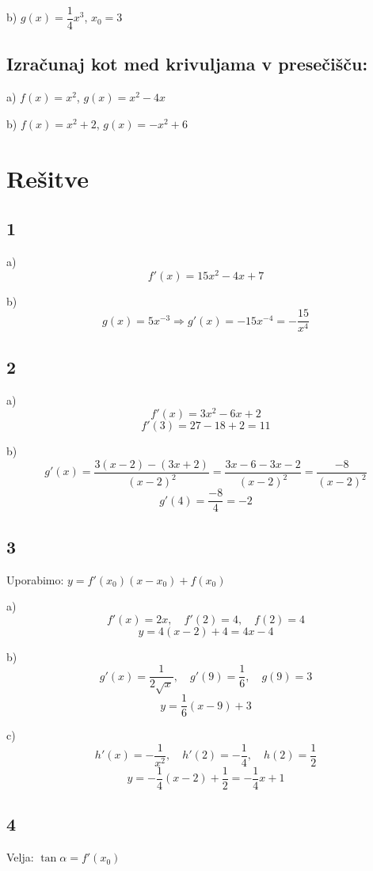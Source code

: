 \documentclass[a4paper,12pt]{article}
\begin{document}
b) $g(x)=\dfrac{1}{4}x^3$, \quad $x_0=3$


\vspace{1cm}


\addtocounter{tocke}{3+3}
\subsection{Izračunaj kot med krivuljama v presečišču:}

a) $f(x)=x^2$, \quad $g(x)=x^2-4x$

b) $f(x)=x^2+2$, \quad $g(x)=-x^2+6$

\vfill


\newpage

\section*{Rešitve}

\subsection*{1}
a)
\[
f'(x)=15x^2-4x+7
\]

b)
\[
g(x)=5x^{-3} \Rightarrow g'(x)=-15x^{-4}=-\frac{15}{x^4}
\]

\subsection*{2}
a)
\[
f'(x)=3x^2-6x+2
\]
\[
f'(3)=27-18+2=11
\]

b)
\[
g'(x)=\frac{3(x-2)-(3x+2)}{(x-2)^2}
=\frac{3x-6-3x-2}{(x-2)^2}
=\frac{-8}{(x-2)^2}
\]
\[
g'(4)=\frac{-8}{4}=-2
\]

\subsection*{3}
Uporabimo: $y=f'(x_0)(x-x_0)+f(x_0)$

a)
\[
f'(x)=2x,\quad f'(2)=4,\quad f(2)=4
\]
\[
y=4(x-2)+4=4x-4
\]

b)
\[
g'(x)=\frac{1}{2\sqrt{x}},\quad g'(9)=\frac{1}{6},\quad g(9)=3
\]
\[
y=\frac{1}{6}(x-9)+3
\]

c)
\[
h'(x)=-\frac{1}{x^2},\quad h'(2)=-\frac{1}{4},\quad h(2)=\frac{1}{2}
\]
\[
y=-\frac{1}{4}(x-2)+\frac{1}{2}=-\frac{1}{4}x+1
\]

\subsection*{4}
Velja: $\tan \alpha = f'(x_0)$
\end{document}

